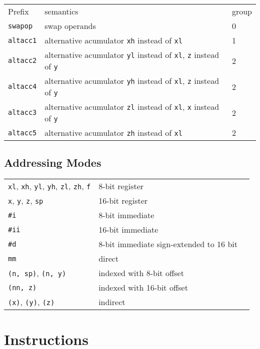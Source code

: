 \documentclass{book}
\begin{document}
\begin{tabular}{l l l}
Prefix & semantics & group \\
\texttt{swapop} & swap operands & 0 \\
\texttt{altacc1} & alternative acumulator \texttt{xh} instead of \texttt{xl} & 1 \\
\texttt{altacc2} & alternative acumulator \texttt{yl} instead of \texttt{xl}, \texttt{z} instead of \texttt{y} & 2 \\
\texttt{altacc4} & alternative acumulator \texttt{yh} instead of \texttt{xl}, \texttt{z} instead of \texttt{y} & 2 \\
\texttt{altacc3} & alternative acumulator \texttt{zl} instead of \texttt{xl}, \texttt{x} instead of \texttt{y} & 2 \\
\texttt{altacc5} & alternative acumulator \texttt{zh} instead of \texttt{xl} & 2
\end{tabular}

\section{Addressing Modes}

\begin{tabular}{l l l}
\texttt{xl}, \texttt{xh}, \texttt{yl}, \texttt{yh}, \texttt{zl}, \texttt{zh}, \texttt{f} & 8-bit register \\
\texttt{x}, \texttt{y}, \texttt{z}, \texttt{sp} & 16-bit register \\
\texttt{\#i} & 8-bit immediate \\
\texttt{\#ii} & 16-bit immediate \\
\texttt{\#d} & 8-bit immediate sign-extended to 16 bit \\
\texttt{mm} & direct \\
\texttt{(n, sp)}, \texttt{(n, y)} & indexed with 8-bit offset \\
\texttt{(nn, z)} & indexed with 16-bit offset \\
\texttt{(x)}, \texttt{(y)}, \texttt{(z)} & indirect
\end{tabular}


\chapter{Instructions}
\end{document}
